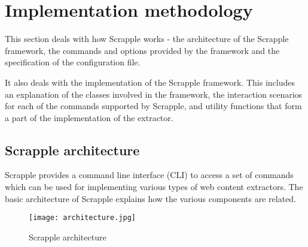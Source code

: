 \documentclass[letterpaper,12pt,english]{sphinxmanual}
\begin{document}
\chapter{Implementation methodology}
\label{index:implementation-methodology}
This section deals with how Scrapple works - the architecture of the Scrapple framework, the commands and options provided by the framework and the specification of the configuration file.

It also deals with the implementation of the Scrapple framework. This includes an explanation of the classes involved in the framework, the interaction scenarios for each of the commands supported by Scrapple, and utility functions that form a part of the implementation of the extractor.


\section{Scrapple architecture}
\label{framework/basic:framework-basic}\label{framework/basic::doc}\label{framework/basic:scrapple-architecture}
Scrapple provides a command line interface (CLI) to access a set of commands which can be used for implementing various types of web content extractors. The basic architecture of Scrapple explains how the various components are related.
\begin{figure}[htbp]
\centering
\capstart

\texttt{[image: architecture.jpg]}
\caption{Scrapple architecture}\end{figure}
\end{document}
